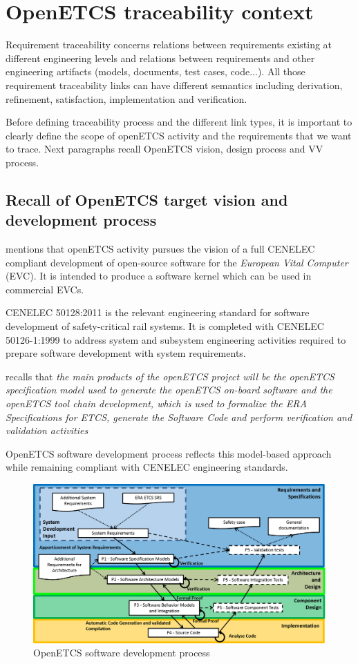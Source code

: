 \documentclass[11pt]{template/openetcs_report}
\begin{document}
\chapter{OpenETCS traceability context}

Requirement traceability concerns relations between requirements existing at different engineering levels and relations between requirements and other engineering artifacts (models, documents, test cases, code...). All those requirement traceability links can have different semantics including derivation, refinement, satisfaction, implementation and verification. 

Before defining traceability process and the different link types, it is important to clearly define the scope of openETCS activity and the requirements that we want to trace. Next paragraphs recall OpenETCS vision, design process and VV process.

\section{Recall of OpenETCS target vision and development process}
\label{OpenETCS scope}
\cite{D2.3a} mentions that openETCS activity pursues the vision of a full CENELEC compliant development of open-source software for the \emph{European Vital   Computer} (EVC). It is intended to produce a software kernel which can be used in commercial EVCs.

CENELEC 50128:2011 is the relevant engineering standard for software development of safety-critical rail systems. It is completed with CENELEC 50126-1:1999 to address system and subsystem engineering activities required to prepare software development with system requirements. 


\cite{D4.2.3} recalls that \textit{the main products of the openETCS project will be the openETCS specification model used to generate the openETCS on-board software and the openETCS tool chain development, which is used to formalize the ERA Specifications for ETCS, generate the Software Code and perform verification and validation activities} 

OpenETCS software development process reflects this model-based approach while remaining compliant with CENELEC engineering standards. 

\begin{figure} [htbp]
\centering
\includegraphics[width=.9\linewidth]
{./images/OpenETCSDevelopmentProcess.png}
\caption{\label{fig:OpenETCSDevelopmentProcess}OpenETCS software development process}
\end{figure} 
\end{document}
